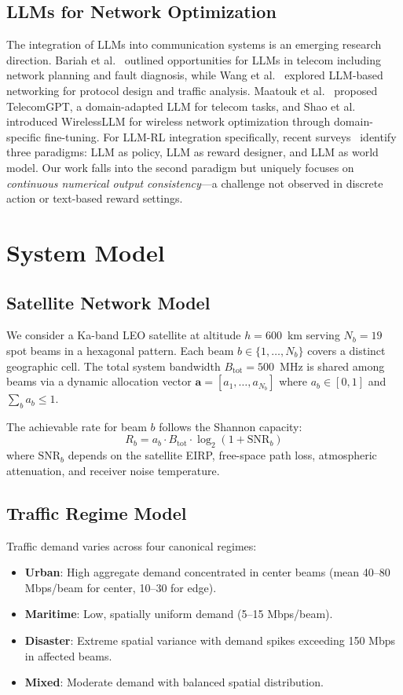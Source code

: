 \documentclass[conference]{IEEEtran}
\begin{document}
\subsection{LLMs for Network Optimization}
The integration of LLMs into communication systems is an emerging research direction. Bariah et al.~\cite{llm_telecom} outlined opportunities for LLMs in telecom including network planning and fault diagnosis, while Wang et al.~\cite{llm_network} explored LLM-based networking for protocol design and traffic analysis. Maatouk et al.~\cite{maatouk2023telecomgpt} proposed TelecomGPT, a domain-adapted LLM for telecom tasks, and Shao et al.~\cite{shao2024wirelessllm} introduced WirelessLLM for wireless network optimization through domain-specific fine-tuning. For LLM-RL integration specifically, recent surveys~\cite{cao2024llmrl_survey} identify three paradigms: LLM as policy, LLM as reward designer, and LLM as world model. Our work falls into the second paradigm but uniquely focuses on \emph{continuous numerical output consistency}---a challenge not observed in discrete action or text-based reward settings.

\section{System Model}

\subsection{Satellite Network Model}
We consider a Ka-band LEO satellite at altitude $h = 600$~km serving $N_b = 19$ spot beams in a hexagonal pattern. Each beam $b \in \{1, \ldots, N_b\}$ covers a distinct geographic cell. The total system bandwidth $B_{\text{tot}} = 500$~MHz is shared among beams via a dynamic allocation vector $\mathbf{a} = [a_1, \ldots, a_{N_b}]$ where $a_b \in [0, 1]$ and $\sum_b a_b \leq 1$.

The achievable rate for beam $b$ follows the Shannon capacity:
\begin{equation}
R_b = a_b \cdot B_{\text{tot}} \cdot \log_2\left(1 + \text{SNR}_b\right)
\end{equation}
where $\text{SNR}_b$ depends on the satellite EIRP, free-space path loss, atmospheric attenuation, and receiver noise temperature.

\subsection{Traffic Regime Model}
Traffic demand varies across four canonical regimes:
\begin{itemize}
\item \textbf{Urban}: High aggregate demand concentrated in center beams (mean 40--80 Mbps/beam for center, 10--30 for edge).
\item \textbf{Maritime}: Low, spatially uniform demand (5--15 Mbps/beam).
\item \textbf{Disaster}: Extreme spatial variance with demand spikes exceeding 150 Mbps in affected beams.
\item \textbf{Mixed}: Moderate demand with balanced spatial distribution.
\end{itemize}
\end{document}
